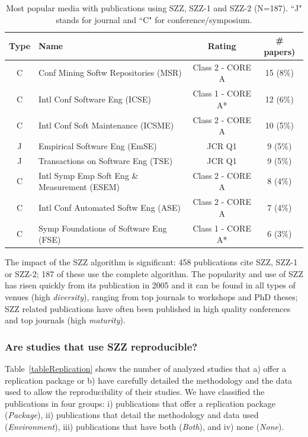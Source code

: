 \documentclass[a4paper, 12pt]{book}
\begin{document}
\begin{table}[!t]
\renewcommand{\arraystretch}{0.8}
\caption{Most popular media with publications using SZZ, SZZ-1 and SZZ-2 (N=187). ``J" stands for journal and ``C" for conference/symposium.}
\label{tableConferences}
\centering
\begin{adjustbox}{max width=\textwidth}
\begin{tabular}{|c|p{7.6cm}|c|c|}
\hline
Type & Name & Rating & \# papers)  \\
\hline
\hline
C & Conf Mining Softw Repositories (MSR) & Class 2 - CORE A & 15 (8\%) \\
\hline
C & Intl Conf Software Eng (ICSE)& Class 1 - CORE A* & 12 (6\%) \\
\hline
C & Intl Conf Soft Maintenance (ICSME) & Class 2 - CORE A & 10 (5\%) \\
\hline
J& Empirical Software Eng (EmSE) & JCR Q1 & 9 (5\%) \\
\hline
J & Transactions on Software Eng (TSE) & JCR Q1 & 9 (5\%) \\
\hline
C & Intl Symp Emp Soft Eng \& Measurement (ESEM) & Class 2 - CORE A & 8 (4\%)\\
\hline
C & Intl Conf Automated Softw Eng (ASE)& Class 2 - CORE A& 7 (4\%) \\
\hline
C &  Symp Foundations of Software Eng (FSE) & Class 1 - CORE A* & 6 (3\%) \\
\hline
\end{tabular}
\end{adjustbox}
\end{table}


The impact of the SZZ algorithm is significant: 458 publications cite SZZ, SZZ-1 or SZZ-2; 187 of these use the complete algorithm. The popularity and use of SZZ has risen quickly from its publication in 2005 and it can be found in all types of venues (high \emph{diversity}), ranging from top journals to workshops and PhD theses; SZZ related publications have often been published in high quality conferences and top journals (high \emph{maturity}).



\subsubsection{Are studies that use SZZ reproducible?}
Table~\ref{tableReplication} shows the number of analyzed studies that a) offer a replication package or b) have carefully detailed the methodology and the data used to allow the reproducibility of their studies. We have classified the publications in four groups: i) publications that offer a replication package (\emph{Package}), ii) publications that detail the methodology and data used (\emph{Environment}), iii) publications that have both (\emph{Both}), and iv) none (\emph{None}).
\end{document}
